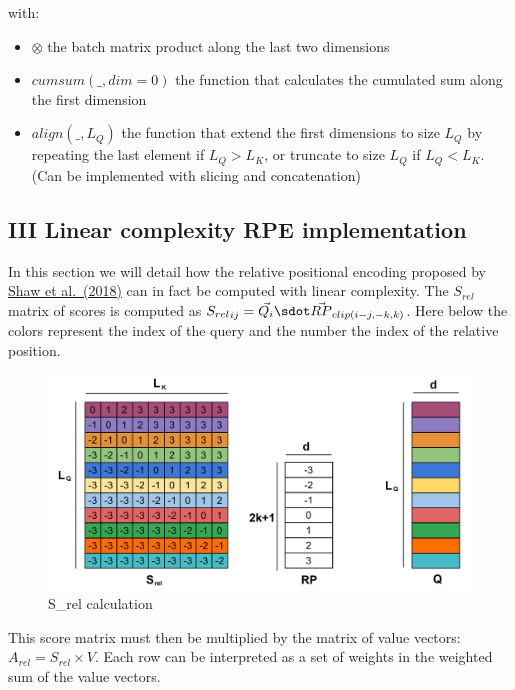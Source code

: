 with:

\begin{itemize}
\tightlist
\item
  \(\otimes\) the batch matrix product along the last two dimensions
\item
  \(cumsum(\_, dim=0)\) the function that calculates the cumulated sum
  along the first dimension
\item
  \(align(\_, L_Q)\) the function that extend the first dimensions to
  size \(L_Q\) by repeating the last element if \(L_Q > L_K\), or
  truncate to size \(L_Q\) if \(L_Q < L_K\). (Can be implemented with
  slicing and concatenation)
\end{itemize}

\hypertarget{iii-linear-complexity-rpe-implementation}{%
\subsection{III Linear complexity RPE
implementation}\label{iii-linear-complexity-rpe-implementation}}

In this section we will detail how the relative positional encoding
proposed by \href{https://arxiv.org/abs/1803.02155}{Shaw et al.~(2018)}
can in fact be computed with linear complexity. The \(S_{rel}\) matrix
of scores is computed as
\({S_{rel}}_{ij} = \vec{Q_i} \sdot \vec{RP}_{clip(i-j, -k, k)}\). Here
below the colors represent the index of the query and the number the
index of the relative position.

\begin{figure}
\centering
\includegraphics{images/S_rel.png}
\caption{S\_rel calculation}
\end{figure}

This score matrix must then be multiplied by the matrix of value
vectors: \(A_{rel} = S_{rel} \times V\). Each row can be interpreted as
a set of weights in the weighted sum of the value vectors.

